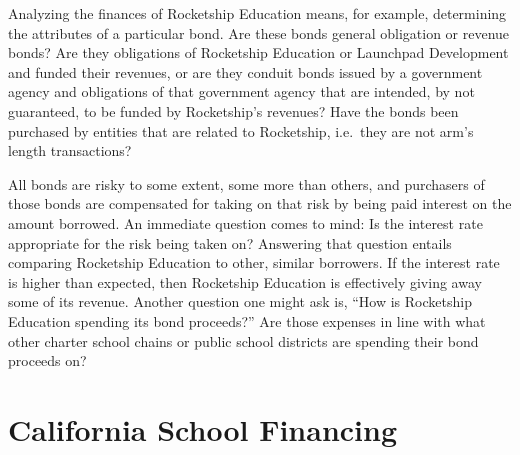 Analyzing the finances of Rocketship Education means, for example, determining
the attributes of a particular bond. Are these bonds general obligation or revenue bonds? Are they obligations of Rocketship Education or Launchpad Development and funded their revenues, or are they conduit bonds issued by a government agency and obligations of that government agency that are intended, by not guaranteed, to be funded by Rocketship's revenues? Have the bonds been purchased by entities that are related to Rocketship, i.e.~they are not arm's length transactions? 

All bonds are risky to some extent, some more than others, and purchasers of those bonds are compensated for taking on that risk by being paid interest on the amount borrowed. An immediate question comes to mind: Is the interest rate appropriate for the risk being taken on? Answering that question entails comparing Rocketship Education to other, similar borrowers. If the interest rate is higher than expected, then Rocketship Education is effectively giving away some of its revenue. Another question one might ask is, ``How is Rocketship Education spending its bond proceeds?'' Are those expenses in line with what other charter school chains or public school districts are spending their bond proceeds on?

\section{California School Financing}\label{sec:ca-overview}\indent

